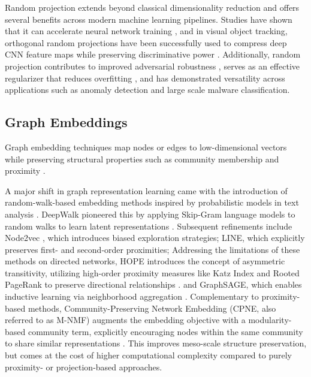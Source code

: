 \documentclass[conference]{IEEEtran}
\begin{document}
Random projection extends beyond classical dimensionality reduction and offers several benefits across modern machine learning pipelines. Studies have shown that it can accelerate neural network training \cite{cai2019enhanced, rpdeep2020}, and in visual object tracking, orthogonal random projections have been successfully used to compress deep CNN feature maps while preserving discriminative power \cite{zhang2021correlation}. Additionally, random projection contributes to improved adversarial robustness \cite{nguyen2016}, serves as an effective regularizer that reduces overfitting \cite{tasoulis2020}, and has demonstrated versatility across applications such as anomaly detection \cite{bauw2021} and large scale malware classification\cite{dahl2013malware}.

\subsection{Graph Embeddings}

Graph embedding techniques map nodes or edges to low-dimensional vectors while preserving structural properties such as community membership and proximity \cite{xie2017survey}.

A major shift in graph representation learning came with the introduction of random-walk-based embedding methods inspired by probabilistic models in text analysis \cite{mimno2012random}. DeepWalk pioneered this by applying Skip-Gram language models to random walks to learn latent representations \cite{perozzi2014}. Subsequent refinements include Node2vec \cite{grover2016node2vec}, which introduces biased exploration strategies; LINE\cite{tang2015line}, which explicitly preserves first- and second-order proximities; Addressing the limitations of these methods on directed networks, HOPE introduces the concept of asymmetric transitivity, utilizing high-order proximity measures like Katz Index and Rooted PageRank to preserve directional relationships \cite{ou2016atp}. and GraphSAGE, which enables inductive learning via neighborhood aggregation \cite{khemani2024}.
Complementary to proximity-based methods, Community-Preserving Network Embedding (CPNE, also referred to as M-NMF) augments the embedding objective with a modularity-based community term, explicitly encouraging nodes within the same community to share similar representations \cite{wang2017cpne}. This improves meso-scale structure preservation, but comes at the cost of higher computational complexity compared to purely proximity- or projection-based approaches.
\end{document}
